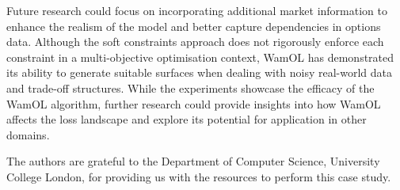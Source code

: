 \documentclass[sigconf, authorversion=true, nonacm=true]{acmart}
\begin{document}
Future research could focus on incorporating additional market information to enhance the realism of the model and better capture dependencies in options data. Although the soft constraints approach does not rigorously enforce each constraint in a multi-objective optimisation context, WamOL has demonstrated its ability to generate suitable surfaces when dealing with noisy real-world data and trade-off structures. While the experiments showcase the efficacy of the WamOL algorithm, further research could provide insights into how WamOL affects the loss landscape and explore its potential for application in other domains.

\begin{acks}
The authors are grateful to the Department of Computer Science, University College London, for providing us with the resources to perform this case study.
\end{acks}



\end{document}
